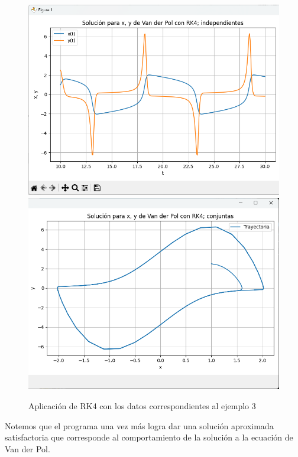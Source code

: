 \begin{figure}[H]
	\centering
	\includegraphics[scale=0.5]{../auxiliary/assets/ejemplo3-indiv.png}
	\includegraphics[scale=0.5]{../auxiliary/assets/ejemplo3-conj.png}
	\caption{Aplicación de RK4 con los datos correspondientes al ejemplo 3}
\end{figure}
Notemos que el programa una vez más logra dar una solución aproximada satisfactoria que corresponde al comportamiento de la solución a la ecuación de Van der Pol.
